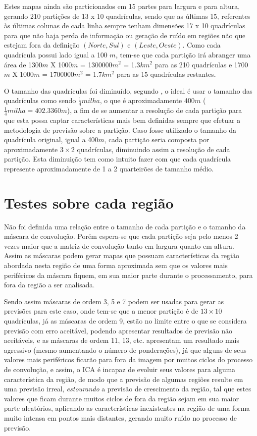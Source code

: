 Estes mapas ainda são particionados em 15 partes para largura e para altura, gerando 210 partições de 13 x 10 quadrículas, sendo que as últimas 15, referentes às últimas colunas de cada linha sempre tenham dimensões 17 x 10 quadrículas para que não haja perda de informação ou geração de ruído em regiões não que estejam fora da definição \((Norte, Sul)\) e \((Leste, Oeste)\). Como cada quadrícula possui lado igual a 100 \(m\), tem-se que cada partição irá abranger uma área de 1300\(m\) X 1000\(m\) = 1300000\(m^2\) = 1.3\(km^2\) para as 210 quadrículas e 1700\(m\) X 1000\(m\) = 1700000\(m^2\) = 1.7\(km^2\)  para as 15 quadrículas restantes.

O tamanho das quadrículas foi diminuído, segundo \citeauthor{willis2002spatial}, o ideal é usar o tamanho das quadrículas como sendo \(\frac{1}{4} milha\), o que é aproximadamente 400\(m\) (\(\frac{1}{4} milha = 402.3360m\)), a fim de se aumentar a resolução de cada partição para que esta possa captar características mais bem definidas sempre que efetuar a metodologia de previsão sobre a partição. Caso fosse utilizado o tamanho da quadrícula original, igual a 400\(m\), cada partição seria composta por aproximadamente \(3 \times 2\) quadrículas, diminuindo assim a resolução de cada partição. Esta diminuição tem como intuito fazer com que cada quadrícula represente aproximadamente de 1 a 2 quarteirões de tamanho médio.

\section{Testes sobre cada região}
\label{Exp:Testes sobre cada região}

Não foi definida uma relação entre o tamanho de cada partição e o tamanho da máscara de convolução. Porém espera-se que cada partição seja pelo menos 2 vezes maior que a matriz de convolução tanto em largura quanto em altura. Assim as máscaras podem gerar mapas que possuam características da região abordada nesta região de uma forma aproximada sem que os valores mais periféricos da máscara fiquem, em sua maior parte durante o processamento, para fora da região a ser analisada. 

Sendo assim máscaras de ordem 3, 5 e 7 podem ser usadas para gerar as previsões para este caso, onde tem-se que a menor partição é de \(13 \times 10\) quadrículas, já as máscaras  de ordem 9, estão no limite entre o que se considera previsão com erro aceitável, podendo apresentar resultados de previsão não aceitáveis, e as máscaras de ordem 11, 13, etc. apresentam um resultado mais agressivo (mesmo aumentando o número de ponderações), já que alguns de seus valores mais periféricos ficarão para fora da imagem por muitos ciclos do processo de convolução, e assim, o ICA é incapaz de evoluir seus valores para alguma característica da região, de modo que a previsão de algumas regiões resulte em uma previsão irreal, \emph{estourando} a previsão de crescimento da região, tal que estes valores que ficam durante muitos ciclos de fora da região sejam em sua maior parte aleatórios, aplicando as características inexistentes na região de uma forma muito intensa em pontos mais distantes, gerando muito ruído no processo de previsão. 

